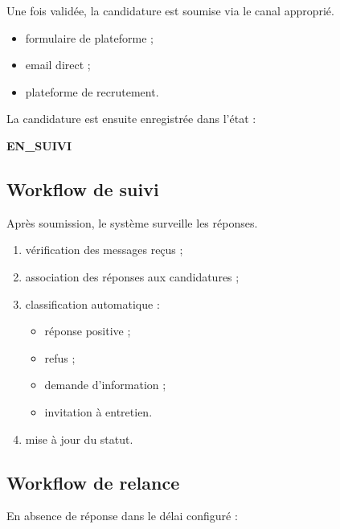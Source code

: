 \documentclass[11pt,a4paper]{article}
\begin{document}
Une fois validée, la candidature est soumise via le canal approprié.

\begin{itemize}

\item formulaire de plateforme ;

\item email direct ;

\item plateforme de recrutement.

\end{itemize}

La candidature est ensuite enregistrée dans l’état :

\begin{center}
\textbf{EN\_SUIVI}
\end{center}

\subsection{Workflow de suivi}

Après soumission, le système surveille les réponses.

\begin{enumerate}

\item vérification des messages reçus ;

\item association des réponses aux candidatures ;

\item classification automatique :

\begin{itemize}
\item réponse positive ;
\item refus ;
\item demande d'information ;
\item invitation à entretien.
\end{itemize}

\item mise à jour du statut.

\end{enumerate}

\subsection{Workflow de relance}

En absence de réponse dans le délai configuré :
\end{document}
